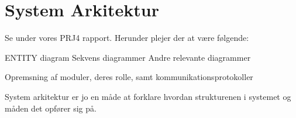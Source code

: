 \graphicspath{{Chapters/SystemArkitektur/}}

\section{System Arkitektur}

Se under vores PRJ4 rapport.
Herunder plejer der at være følgende:


ENTITY diagram
Sekvens diagrammer
Andre relevante diagrammer

Opremsning af moduler, deres rolle, samt kommunikationsprotokoller


System arkitektur er jo en måde at forklare hvordan strukturenen i systemet og måden det opfører sig på.